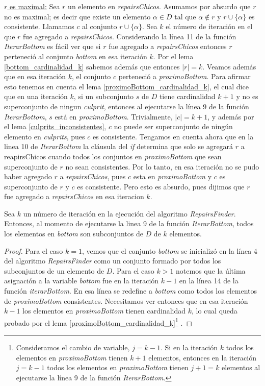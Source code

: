 \documentclass[11pt,a4paper,twoside]{tesis}
\begin{document}
\underline{$r$ es maximal:} Sea $r$ un elemento en \textit{repairsChicos}. Asumamos por absurdo que $r$ no es maximal; es decir que existe un elemento $\alpha \in D$ tal que $\alpha \not\in r$ y $r \cup \{\alpha\}$ es consistente. Llamamos $c$ al conjunto $r \cup \{\alpha\}$. Sea $k$ el número de iteración en el que $r$ fue agregado a \textit{repairsChicos}. Considerando la línea 11 de la función \textit{IterarBottom} es fácil ver que si $r$ fue agregado a \textit{repairsChicos} entonces $r$ perteneció al conjunto \textit{bottom} en esa iteración $k$. Por el lema \ref{bottom_cardinalidad_k} sabemos además que entonces $|r| = k$. Veamos además que en esa iteración $k$, el conjunto $c$ perteneció a \textit{proximoBottom}. Para afirmar esto tenemos en cuenta el lema \ref{proximoBottom_cardinalidad_k}, el cual dice que en una iteración $k$, si un subconjunto $s$ de $D$ tiene cardinalidad $k+1$ y no es superconjunto de ningun \textit{culprit}, entonces al ejecutarse la línea 9 de la función \textit{IterarBottom}, $s$ está en \textit{proximoBottom}. Trivialmente, $|c| = k+1$, y además por el lema \ref{culprits_inconsistentes}, $c$ no puede ser superconjunto de ningún elemento en \textit{culprits}, pues $c$ es consistente.
Tengamos en cuenta ahora que en la linea 10 de \textit{IterarBottom} la cláusula del \textit{if} determina que solo se agregará $r$ a reapirsChicos cuando todos los conjuntos en \textit{proximoBottom} que sean superconjunto de $r$ no sean consistentes. Por lo tanto, en esa iteración no se pudo haber agregado $r$ a \textit{repairsChicos}, pues $c$ esta en \textit{proximoBottom} y $c$ es superconjunto de $r$ y $c$ es consistente. Pero esto es absurdo, pues dijimos que $r$ fue agregado a \textit{repairsChicos} en esa iteracion $k$.

\begin{lemma}\label{bottom_cardinalidad_k}
Sea $k$ un número de iteración en la ejecución del algoritmo \textit{RepairsFinder}. Entonces, al momento de ejecutarse la linea 9 de la función \textit{IterarBottom}, todos los elementos en \textit{bottom} son subconjuntos de $D$ de $k$ elementos.
\end{lemma}

\begin{proof}
Para el caso $k = 1$, vemos que el conjunto \textit{bottom} se inicializó en la línea 4 del algoritmo \textit{RepairsFinder} como un conjunto formado por todos los subconjuntos de un elemento de $D$. Para el caso $k>1$ notemos que la última asignación a la variable \textit{bottom} fue en la iteración $k-1$ en la línea 14 de la función \textit{iterarBottom}. En esa línea se redefine a \textit{bottom} como todos los elementos de \textit{proximoBottom} consistentes. Necesitamos ver entonces que en esa iteración $k-1$ los elementos en \textit{proximoBottom} tienen cardinalidad $k$, lo cual queda probado por el lema \ref{proximoBottom_cardinalidad_k}\footnote{Consideramos el cambio de variable, $j = k-1$. Si en la iteración $k$ todos los elementos en \textit{proximoBottom} tienen $k+1$ elementos, entonces en la iteración $j = k-1$ todos los elementos en \textit{proximoBottom} tienen $j + 1 = k$ elementos al ejecutarse la línea 9 de la función \textit{IterarBottom}.} .
\end{proof}
\end{document}
